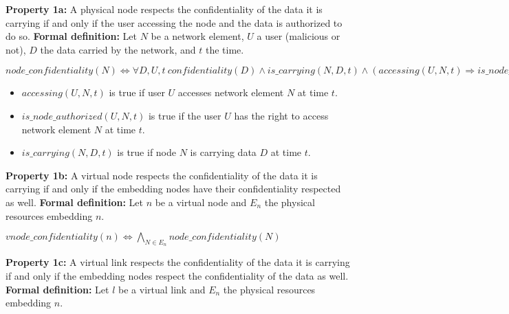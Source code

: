 
\textbf{Property 1a:} A physical node respects the confidentiality of the data it is carrying if and only if the user accessing the node and the data is authorized to do so.
\newline \textbf{Formal definition:} Let $N$ be a network element, $U$ a user (malicious or not), $D$ the data carried by the network, and $t$ the time.


\begin{myformula}
$node\_confidentiality(N) \Leftrightarrow \forall D,U,t~
confidentiality(D) \wedge is\_carrying(N,D,t) \wedge (accessing(U,N,t) \Rightarrow is\_node\_authorized(U,N,t))$
\end{myformula}

\begin{itemize}
\item $accessing(U,N,t)$ is true if user $U$ accesses network element $N$ at time $t$.
\item $is\_node\_authorized(U,N,t)$ is true if the user $U$ has the right to access network element $N$ at time $t$.
\item $is\_carrying(N,D,t)$ is true if node $N$ is carrying data $D$ at time $t$.
\end{itemize}

\textbf{Property 1b:} A virtual node respects the confidentiality of the data it is carrying if and only if the embedding nodes have their confidentiality respected as well.
\newline \textbf{Formal definition:} Let $n$ be a virtual node and $E_n$ the physical resources embedding $n$.


\begin{myformula}
$vnode\_confidentiality(n) \Leftrightarrow \bigwedge\limits_{N\in E_n} node\_confidentiality(N) $
\end{myformula}

\textbf{Property 1c:} A virtual link respects the confidentiality of the data it is carrying if and only if the embedding nodes respect the confidentiality of the data as well.
\newline \textbf{Formal definition:} Let $l$ be a virtual link and $E_n$ the physical resources embedding $n$.


